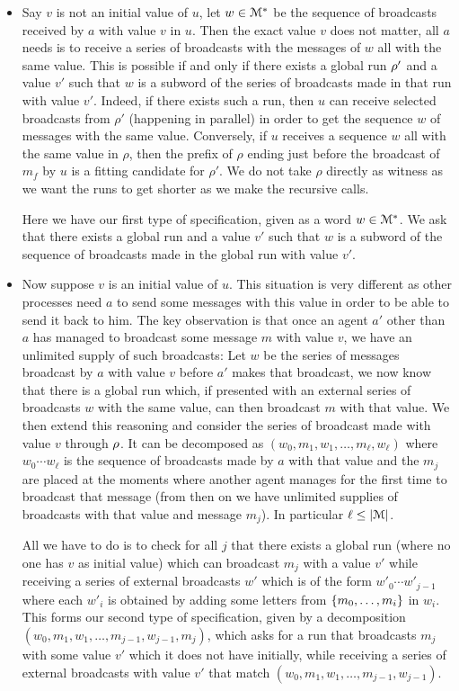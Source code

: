 \begin{itemize}
	\item 
	Say $v$ is not an initial value of $u$, let $w \in \mathcal{M}^*$ be the sequence of broadcasts received by $a$ with value $v$ in $u$. Then the exact value $v$ does not matter, all $a$ needs is to receive a series of broadcasts with the messages of $w$ all with the same value. This is possible if and only if there exists a global run $\rho'$ and a value $v'$ such that $w$ is a subword of the series of broadcasts made in that run with value $v'$. Indeed, if there exists such a run, then $u$ can receive selected broadcasts from $\rho'$ (happening in parallel) in order to get the sequence $w$ of messages with the same value. Conversely, if $u$ receives a sequence $w$ all with the same value in $\rho$, then the prefix of $\rho$ ending just before the broadcast of $m_f$ by $u$ is a fitting candidate for $\rho'$.
	We do not take $\rho$ directly as witness as we want the runs to get shorter as we make the recursive calls.
	
	Here we have our first type of specification, given as a word $w \in \mathcal{M}^*$. We ask that there exists a global run and a value $v'$ such that $w$ is a subword of the sequence of broadcasts made in the global run with value $v'$.
	
	
	\item 	
	Now suppose $v$ is an initial value of $u$. This situation is very different as other processes need $a$ to send some messages with this value in order to be able to send it back to him.
	The key observation is that once an agent $a'$ other than $a$ has managed to broadcast some message $m$ with value $v$, we have an unlimited supply of such broadcasts:
	Let $w$ be the series of messages broadcast by $a$ with value $v$ before $a'$ makes that broadcast, we now know that there is a global run which, if presented with an external series of broadcasts $w$ with the same value, can then broadcast $m$ with that value.
	We then extend this reasoning and consider the series of broadcast made with value $v$ through $\rho$. It can be decomposed as  $(w_0, m_1, w_1, \ldots, m_\ell, w_\ell)$ where $w_0 \cdots w_\ell$ is the sequence of broadcasts made by $a$ with that value and the $m_j$ are placed at the moments where another agent manages for the first time to broadcast that message (from then on we have unlimited supplies of broadcasts with that value and message $m_j$). In particular $\ell \leq |\mathcal{M}|$.
	
	All we have to do is to check for all $j$ that there exists a global run (where no one has $v$ as initial value) which can broadcast $m_j$ with a value $v'$ while receiving a series of external broadcasts $w'$ which is of the form $w'_0\cdots w'_{j-1}$ where each $w'_i$ is obtained by adding some letters from $\{m_0, \ldots, m_i\}$ in $w_i$.
	This forms our second type of specification, given by a decomposition $(w_0, m_1, w_1, \ldots, m_{j-1}, w_{j-1}, m_j)$, which asks for a run that broadcasts $m_j$ with some value $v'$ which it does not have initially, while receiving a series of  external broadcasts with value $v'$ that match $(w_0, m_1, w_1, \ldots, m_{j-1}, w_{j-1})$.
\end{itemize}   

